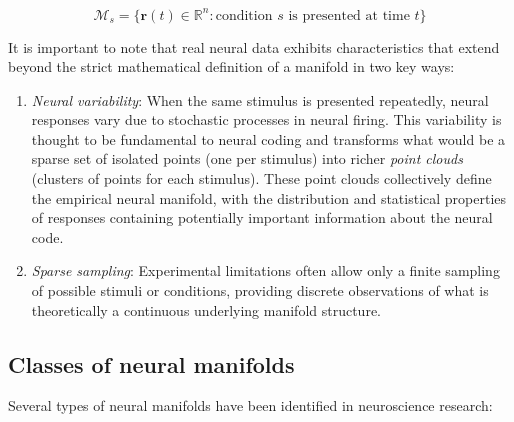 \documentclass[11pt,a4paper]{article}
\begin{document}
\begin{equation}
\mathcal{M}_s = \{\mathbf{r}(t) \in \mathbb{R}^n : \text{condition } s \text{ is presented at time } t\}
\end{equation}

It is important to note that real neural data exhibits characteristics that extend beyond the strict mathematical definition of a manifold in two key ways:

\begin{enumerate}
    \item \textit{Neural variability}: When the same stimulus is presented repeatedly, neural responses vary due to stochastic processes in neural firing. This variability is thought to be fundamental to neural coding and transforms what would be a sparse set of isolated points (one per stimulus) into richer \textit{point clouds} (clusters of points for each stimulus). These point clouds collectively define the empirical neural manifold, with the distribution and statistical properties of responses containing potentially important information about the neural code.
    
    \item \textit{Sparse sampling}: Experimental limitations often allow only a finite sampling of possible stimuli or conditions, providing discrete observations of what is theoretically a continuous underlying manifold structure.
\end{enumerate}

\subsection{Classes of neural manifolds}

Several types of neural manifolds have been identified in neuroscience research:
\end{document}
